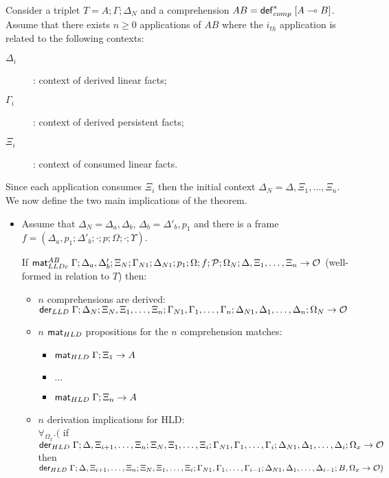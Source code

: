\begin{theorem}\label{thm:multiple_comprehension_derivation}
Consider a triplet $T = A; \Gamma; \Delta_{N}$ and a comprehension $AB =
\mathsf{def}_{comp}^{*} \; [A \multimap B]$. Assume that there exists $n \geq 0$ applications of $AB$
where the $i_{th}$ application is related to the following contexts:
\begin{description}
   \item[$\Delta_i$]: context of derived linear facts;
   \item[$\Gamma_i$]: context of derived persistent facts;
   \item[$\Xi_i$]: context of consumed linear facts.
\end{description}

Since each application consumes $\Xi_i$ then the initial context $\Delta_N =
\Delta, \Xi_1, \dotsc, \Xi_n$. We now define the two main implications of the
theorem.

\begin{itemize}[leftmargin=*]
   \item Assume that $\Delta_N = \Delta_a, \Delta_b$, $\Delta_b =
   \Delta'_b, p_1$ and there is a frame $f = (\Delta_a, p_1; \Delta'_b; \cdot;
         p; \Omega; \cdot; \Upsilon)$.

   If $\mathsf{mat}_{LLDc}^{AB} \; \Gamma; \Delta_a, \Delta'_b; \Xi_N; \Gamma_{N1}; \Delta_{N1};
      p_1; \Omega; f; \mathcal{P}; \Omega_N; \Delta, \Xi_1, \dotsc, \Xi_n \rightarrow
      \mathcal{O}$ (well-formed in relation to $T$) then:

   \begin{itemize}[leftmargin=\secondm]
      \item $n$ comprehensions are derived:\\
      $\mathsf{der}_{LLD} \; \Gamma; \Delta_N; \Xi_N, \Xi_1, \dotsc, \Xi_n; \Gamma_{N1},
      \Gamma_1, \dotsc, \Gamma_n; \Delta_{N1}, \Delta_1, \dotsc, \Delta_n; \Omega_N \rightarrow \mathcal{O}$
      \item $n$ $\mathsf{mat}_{HLD} \;$propositions for the $n$ comprehension matches:
      \begin{itemize}[leftmargin=\thirdm]
         \item $\mathsf{mat}_{HLD} \; \Gamma; \Xi_1 \rightarrow A$
         \item $\dots$
         \item $\mathsf{mat}_{HLD} \; \Gamma; \Xi_n \rightarrow A$
      \end{itemize}
      \item $n$ derivation implications for HLD: \\
      $\forall_{\Omega_x}.($ if $\mathsf{der}_{HLD} \; \Gamma; \Delta, \Xi_{i+1}, \dotsc, \Xi_{n}; \Xi_N, \Xi_1,
            \dotsc, \Xi_i; \Gamma_{N1}, \Gamma_1, \dotsc, \Gamma_i; \Delta_{N1},
            \Delta_1, \dotsc, \Delta_i; \Omega_x \rightarrow \mathcal{O}$ then $\mathsf{der}_{HLD} \; \Gamma; \Delta, \Xi_{i+1}, \dotsc, \Xi_{n}; \Xi_N, \Xi_1,
            \dotsc,
            \Xi_i; \Gamma_{N1}, \Gamma_1, \dotsc, \Gamma_{i-1}; \Delta_{N1},
            \Delta_1, \dotsc, \Delta_{i-1}; B, \Omega_x \rightarrow \mathcal{O})$
   \end{itemize}


\end{itemize}
\end{theorem}
